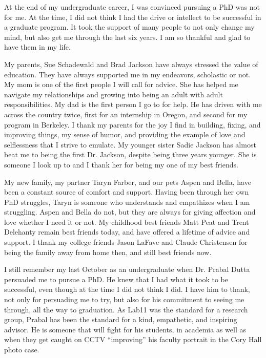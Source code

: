 
\begin{acknowledgements}
At the end of my undergraduate career, I was convinced pursuing a PhD was not for me. At the time, I did not think I had the drive or intellect to be successful in a graduate program. 
It took the support of many people to not only change my mind, but also get me through the last six years. 
I am so thankful and glad to have them in my life.

My parents, Sue Schadewald and Brad Jackson have always stressed the value of education. They have always supported me in my endeavors, scholastic or not.
My mom is one of the first people I will call for advice.
She has helped me navigate my relationships and growing into being an adult with adult responsibilities.
My dad is the first person I go to for help. He has driven with me across the country twice, first for an internship in Oregon, and second for my program in Berkeley.
I thank my parents for the joy I find in building, fixing, and improving things, my sense of humor, and providing the example of love and selflessness that I strive to emulate.
My younger sister Sadie Jackson has almost beat me to being the first Dr. Jackson, despite being three years younger. 
She is someone I look up to and I thank her for being my one of my best friends. 

My new family, my partner Taryn Farber, and our pets Aspen and Bella, have been a constant source of comfort and support.
Having been through her own PhD struggles, Taryn is someone who understands and empathizes when I am struggling.
Aspen and Bella do not, but they are always for giving affection and love whether I need it or not.
My childhood best friends Matt Peat and Trent Delehanty remain best friends today, and have offered a lifetime of advice and support.
I thank my college friends Jason LaFave and Claude Christensen for being the family away from home then, and still best friends now.

I still remember my last October as an undergraduate when Dr. Prabal Dutta persuaded me to pursue a PhD.
He knew that I had what it took to be successful, even though at the time I did not think I did. 
I have him to thank, not only for persuading me to try, but also for his commitment to seeing me through, all the way to graduation.
As Lab11 was the standard for a research group, Prabal has been the standard for a kind, empathetic, and inspiring advisor.
He is someone that will fight for his students, in academia as well as when they get caught on CCTV ``improving'' his faculty portrait in the Cory Hall photo case.


\end{acknowledgements}
